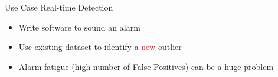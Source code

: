 \documentclass[aspectratio=169]{beamer}
\begin{document}
%
%
%
%
\begin{frame}{Use Case Real-time Detection}

\begin{itemize}
\item Write software to sound an alarm 
\item Use existing dataset to identify a \textcolor{red}{new} outlier
\item Alarm fatigue (high number of False Positives) can be a huge problem
\end{itemize}
\end{frame}
\end{document}
